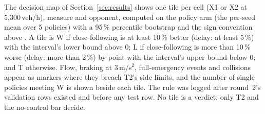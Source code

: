 The decision map of Section~\ref{sec:results} shows one tile per cell (X1 or X2 at 5,300\,veh/h), measure and opponent, computed on the policy arm (the per-seed mean over 5 policies) with a 95\,\% percentile bootstrap and the sign convention above .
A tile is W if close-following is at least 10\,\% better (delay: at least 5\,\%) with the interval's lower bound above 0; L if close-following is more than 10\,\% worse (delay: more than 2\,\%) by point with the interval's upper bound below 0; and T otherwise.
Flow, braking at 3\,m/s$^2$, full-emergency events and collisions appear as markers where they breach T2's side limits, and the number of single policies meeting W is shown beside each tile.
The rule was logged after round~2's validation rows existed and before any test row.
No tile is a verdict: only T2 and the no-control bar decide.
